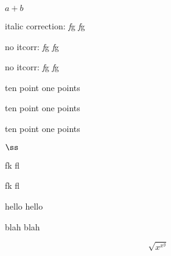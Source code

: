 \documentclass[11pt]{article}
\begin{document}

$a+b$


italic correction: \textit{f}g {\itshape f}g

\def\nocorrlist{g}
no itcorr: \textit{f}g {\itshape f}g

\def\nocorrlist{}
no itcorr: \textit{f\nocorr}g {\itshape f}g

{\fontsize{10.1pt}{10.1pt}\selectfont ten point one points}

{\fontsize{10.1pt}{10.1pt}\selectfont ten point one points}

{\fontsize{10.1pt}{10.1pt}\selectfont ten point one points}

$\ss$ %

fk fl

\selectfont

fk fl

hello \selectfont hello

blah \fontsize{18.7}{0}\selectfont blah

\[
\sqrt{x^{x^y}}
\]
\end{document}
